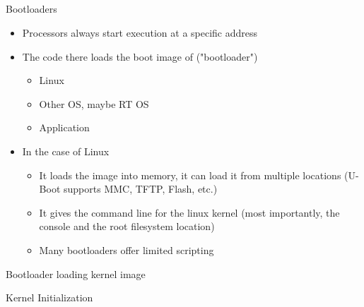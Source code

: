 \documentclass{workshop}
\begin{document}
\subsection{}
\begin{frame}{Bootloaders}
	\begin{itemize}
		\item Processors always start execution at a specific address
		\item The code there loads the boot image of ("bootloader")
			\begin{itemize}
				\item Linux
				\item Other OS, maybe RT OS
				\item Application
			\end{itemize}

		\item In the case of Linux
			\begin{itemize}
				\item It loads the image into memory, it can load it from multiple locations (U-Boot supports MMC, TFTP, Flash, etc.)
				\item It gives the command line for the linux kernel (most importantly, the console and the root filesystem location)
				\item Many bootloaders offer limited scripting 
			\end{itemize}
	\end{itemize}
\end{frame}

\begin{frame}{Bootloader loading kernel image}

\end{frame}

\begin{frame}{Kernel Initialization}
\end{frame}
\end{document}
